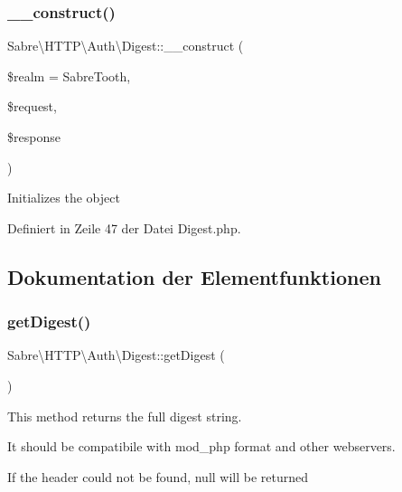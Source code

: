 \subsubsection{\texorpdfstring{\+\_\+\+\_\+construct()}{\_\_construct()}}
{\footnotesize\ttfamily Sabre\textbackslash{}\+H\+T\+T\+P\textbackslash{}\+Auth\textbackslash{}\+Digest\+::\+\_\+\+\_\+construct (\begin{DoxyParamCaption}\item[{}]{\$realm = {\ttfamily \textquotesingle{}SabreTooth\textquotesingle{}},  }\item[{\mbox{\hyperlink{interface_sabre_1_1_h_t_t_p_1_1_request_interface}{Request\+Interface}}}]{\$request,  }\item[{\mbox{\hyperlink{interface_sabre_1_1_h_t_t_p_1_1_response_interface}{Response\+Interface}}}]{\$response }\end{DoxyParamCaption})}

Initializes the object 

Definiert in Zeile 47 der Datei Digest.\+php.



\subsection{Dokumentation der Elementfunktionen}
\mbox{\label{class_sabre_1_1_h_t_t_p_1_1_auth_1_1_digest_af76d324b665e0ae32491d2e1b65a433b}} 
\subsubsection{\texorpdfstring{get\+Digest()}{getDigest()}}
{\footnotesize\ttfamily Sabre\textbackslash{}\+H\+T\+T\+P\textbackslash{}\+Auth\textbackslash{}\+Digest\+::get\+Digest (\begin{DoxyParamCaption}{ }\end{DoxyParamCaption})}

This method returns the full digest string.

It should be compatibile with mod\+\_\+php format and other webservers.

If the header could not be found, null will be returned

